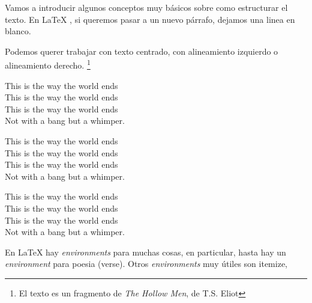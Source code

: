 \documentclass[11pt,a4paper]{article} %
\begin{document}


\maketitle %
\clearpage

\tableofcontents  %
\clearpage

Vamos a introducir algunos conceptos muy b\'asicos sobre como estructurar el texto. En \LaTeX{} , si queremos pasar a un nuevo p\'arrafo, dejamos una linea en blanco.

Podemos querer trabajar con texto centrado, con alineamiento izquierdo o alineamiento derecho. \footnote{El texto es un fragmento de \textit{The Hollow Men}, de T.S. Eliot} %

\begin{center}
This is the way the world ends \\ %
This is the way the world ends \\
This is the way the world ends \\
Not with a bang but a whimper. 
\end{center}

\begin{flushright}
 This is the way the world ends \\ 
This is the way the world ends \\
This is the way the world ends \\
Not with a bang but a whimper. 
\end{flushright}

\begin{flushleft}
This is the way the world ends \\ 
This is the way the world ends \\ 
This is the way the world ends \\
Not with a bang but a whimper. 
\end{flushleft}

En \LaTeX{}  hay \textit{environments} para muchas cosas, en particular, hasta hay un \textit{environment} para poesia (verse). Otros  \textit{environments} muy \'utiles son itemize,
\end{document}
